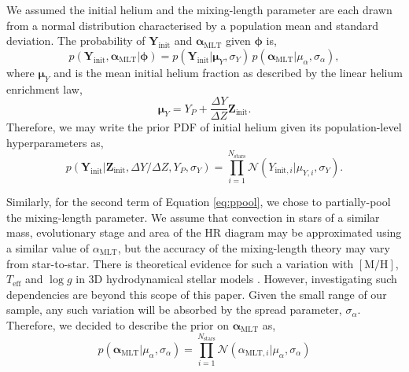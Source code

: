 \documentclass[a4paper,fleqn,usenatbib]{mnras}
\newcommand{\metallicity}{\ensuremath{[\mathrm{M}/\mathrm{H}]}}
\newcommand{\teff}{\ensuremath{T_\mathrm{eff}}}
\newcommand{\mlt}{\ensuremath{{\alpha_\mathrm{MLT}}}}
\begin{document}
We assumed the initial helium and the mixing-length parameter are each drawn from a normal distribution characterised by a population mean and standard deviation. The probability of $\boldsymbol{Y}_\mathrm{init}$ and $\boldsymbol{\alpha}_\mathrm{MLT}$ given $\boldsymbol{\phi}$ is,
%
\begin{equation}
    p(\boldsymbol{Y}_\mathrm{init}, \boldsymbol{\alpha}_\mathrm{MLT} | \boldsymbol{\phi}) = p(\boldsymbol{Y}_\mathrm{init} | \boldsymbol{\mu}_Y, \sigma_Y) \, p(\boldsymbol{\alpha}_\mathrm{MLT} | \mu_\alpha, \sigma_\alpha),
    \label{eq:ppool}
\end{equation}
%
where $\boldsymbol{\mu}_Y$ and is the mean initial helium fraction as described by the linear helium enrichment law,
%
\begin{equation}
    \boldsymbol{\mu}_{Y} = Y_P + \frac{\Delta Y}{\Delta Z} \boldsymbol{Z}_{\mathrm{init}}.\label{eq:helium}
\end{equation}
%
Therefore, we may write the prior PDF of initial helium given its population-level hyperparameters as,
%
\begin{equation}
    p(\boldsymbol{Y}_{\mathrm{init}} | \boldsymbol{Z}_{\mathrm{init}}, {\Delta Y}/{\Delta Z}, Y_P, \sigma_Y) = \prod_{i=1}^{N_\mathrm{stars}} \mathcal{N}({Y}_{\mathrm{init}, i} | {\mu}_{Y, i}, \sigma_Y).
\end{equation}
%

Similarly, for the second term of Equation \ref{eq:ppool}, we chose to partially-pool the mixing-length parameter. We assume that convection in stars of a similar mass, evolutionary stage and area of the HR diagram may be approximated using a similar value of $\mlt$, but the accuracy of the mixing-length theory may vary from star-to-star. There is theoretical evidence for such a variation with $\metallicity$, $\teff$ and $\log{g}$ in 3D hydrodynamical stellar models \citep{Magic.Weiss.ea2015,Viani.Basu.ea2018}. However, investigating such dependencies are beyond this scope of this paper. Given the small range of our sample, any such variation will be absorbed by the spread parameter, $\sigma_\alpha$. Therefore, we decided to describe the prior on $\boldsymbol{\alpha}_\mathrm{MLT}$ as,
%
\begin{equation}
    p(\boldsymbol{\alpha}_{\mathrm{MLT}} | \mu_\alpha, \sigma_\alpha) = \prod_{i=1}^{N_\mathrm{stars}} \mathcal{N}({\alpha}_{\mathrm{MLT}, i} | \mu_\alpha, \sigma_\alpha)
\end{equation}
%
\end{document}
